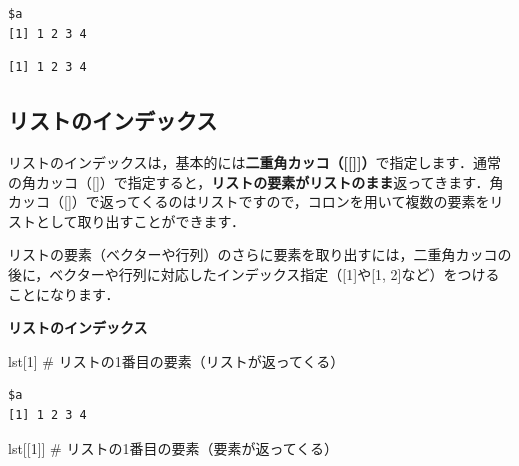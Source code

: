 \documentclass[
  letterpaper,
  DIV=11,
  numbers=noendperiod]{scrreprt}
\newenvironment{Shaded}{\begin{snugshade}}{\end{snugshade}}
\newcommand{\CommentTok}[1]{\textcolor[rgb]{0.37,0.37,0.37}{#1}}
\newcommand{\DecValTok}[1]{\textcolor[rgb]{0.68,0.00,0.00}{#1}}
\newcommand{\NormalTok}[1]{\textcolor[rgb]{0.00,0.23,0.31}{#1}}
\newcommand{\SpecialCharTok}[1]{\textcolor[rgb]{0.37,0.37,0.37}{#1}}
\begin{document}
\begin{verbatim}
$a
[1] 1 2 3 4
\end{verbatim}

\begin{Shaded}
\end{Shaded}

\begin{verbatim}
[1] 1 2 3 4
\end{verbatim}

\hypertarget{ux30eaux30b9ux30c8ux306eux30a4ux30f3ux30c7ux30c3ux30afux30b9}{%
\subsection{リストのインデックス}\label{ux30eaux30b9ux30c8ux306eux30a4ux30f3ux30c7ux30c3ux30afux30b9}}

リストのインデックスは，基本的には\textbf{二重角カッコ（{[}{[}{]}{]}）}で指定します．通常の角カッコ（{[}{]}）で指定すると，\textbf{リストの要素がリストのまま}返ってきます．角カッコ（{[}{]}）で返ってくるのはリストですので，コロンを用いて複数の要素をリストとして取り出すことができます．

リストの要素（ベクターや行列）のさらに要素を取り出すには，二重角カッコの後に，ベクターや行列に対応したインデックス指定（{[}1{]}や{[}1,
2{]}など）をつけることになります．

\textbf{リストのインデックス}

\begin{Shaded}
\begin{Highlighting}[]
\NormalTok{lst[}\DecValTok{1}\NormalTok{] }\CommentTok{\# リストの1番目の要素（リストが返ってくる）}
\end{Highlighting}
\end{Shaded}

\begin{verbatim}
$a
[1] 1 2 3 4
\end{verbatim}

\begin{Shaded}
\begin{Highlighting}[]
\NormalTok{lst[[}\DecValTok{1}\NormalTok{]] }\CommentTok{\# リストの1番目の要素（要素が返ってくる）}
\end{Highlighting}
\end{Shaded}
\end{document}

